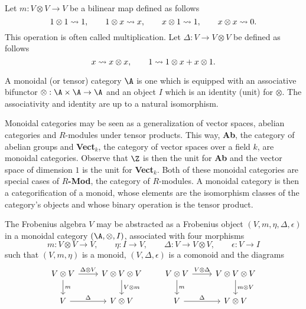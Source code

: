 Let $m : V\otimes V \to V$ be a bilinear map defined as follows 
\begin{equation}
\label{eq:12}
1 \otimes 1 \rightsquigarrow 1, \hspace*{2em} 1 \otimes x \rightsquigarrow x, \hspace*{2em} x \otimes 1 \rightsquigarrow 1,  \hspace*{2em} x \otimes x  \rightsquigarrow 0.
\end{equation}
This operation is often called multiplication. Let $\Delta: V \to V \otimes V$ be defined as follows 
\begin{equation}
\label{eq:13}
x \rightsquigarrow x \otimes x, \hspace*{2em} 1 \rightsquigarrow 1 \otimes x + x \otimes 1.
\end{equation}

A monoidal (or tensor) category $\A$ is one which is equipped with an associative bifunctor $\otimes : \A \times \A \to \A$ and an object $I$ which is an identity (unit) for $\otimes$. The associativity and identity are up to a natural isomorphism.

Monoidal categories may be seen as a generalization of vector spaces, abelian categories and $R$-modules under tensor products. This way, \textbf{Ab}, the category of abelian groups and \textbf{Vect$_k$}, the category of vector spaces over a field $k$, are monoidal categories. Observe that $\Z$ is then the unit for \textbf{Ab} and the vector space of dimension $1$ is the unit for \textbf{Vect$_k$}. Both of these monoidal categories are special cases of \textbf{$R$-Mod}, the category of $R$-modules. A monoidal category is then a categorification of a monoid, whose elements are the isomorphism classes of the category's objects and whose binary operation is the tensor product.

The Frobenius algebra $V$ may be abstracted as a Frobenius object $(V, m, \eta, \Delta, \epsilon)$ in a monoidal category $(\A, \otimes, I)$, associated with four morphisms 
\begin{equation}
\label{eq:15}
m : V \otimes V \to V, \hspace{2em} \eta : I \to V, \hspace{2em} \Delta : V \to V \otimes V, \hspace{2em} \epsilon: V \to I
\end{equation}
such that $(V, m, \eta)$ is a monoid, $(V, \Delta, \epsilon)$ is a comonoid and the diagrams
\begin{equation}
\label{eq:14}
\begin{tikzcd} 
  V \otimes V \arrow[r, "\Delta \otimes V"] \arrow[d, "m"] & V \otimes V \otimes V \arrow[d, "V \otimes m"]\\
  V \arrow[r, "\Delta"] & V \otimes V
\end{tikzcd}
\hspace*{2em}
\begin{tikzcd}
  V \otimes V \arrow[r, "V \otimes \Delta"] \arrow[d, "m"] & V \otimes V \otimes V \arrow[d, "m \otimes V"]\\ 
  V \arrow[r, "\Delta"] & V \otimes V
\end{tikzcd}
\end{equation}

